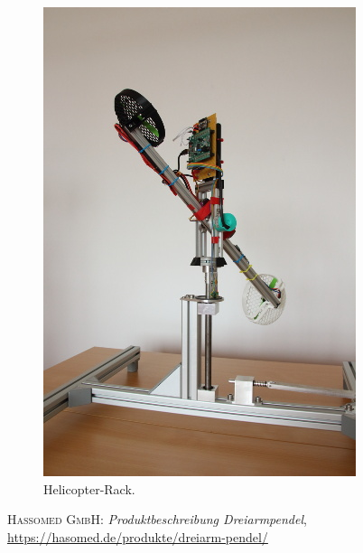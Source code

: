 \documentclass[a4paper,10pt]{scrartcl}
\begin{document}
\begin{figure}[ht]
    \begin{center}
    \includegraphics[width=.8\textwidth,trim=0 2mm 0 5.5mm, clip]{img/heli_klein.jpg}
    \end{center}
    \caption{Helicopter-Rack.}
    \label{fig_helirack1}
\end{figure}


\newpage

    
\renewcommand\refname{Referenzen}
\begin{thebibliography}{}
  \textsc{Hassomed GmbH}: \textit{Produktbeschreibung Dreiarmpendel}, \url{https://hasomed.de/produkte/dreiarm-pendel/}


\end{thebibliography}
\end{document}
